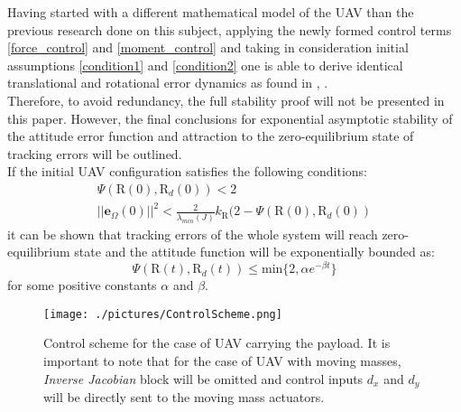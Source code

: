 Having started with a different mathematical model of the UAV than the previous research done on this subject, applying the newly formed control terms \ref{force_control} and \ref{moment_control} and taking in consideration initial assumptions \ref{condition1} and \ref{condition2} one is able to derive identical translational and rotational error dynamics as found in \cite{LeeClanak1}, \cite{LeeClanak4}. \\
Therefore, to avoid redundancy, the full stability proof will not be presented in this paper. However, the final conclusions for exponential asymptotic stability of the attitude error function and attraction to the zero-equilibrium state of tracking errors will be outlined. \\

If the initial UAV configuration satisfies the following conditions:
\begin{gather}
	\Psi (\text{R}(0), \text{R}_d(0)) < 2 \\
	||\textbf{e}_\Omega(0)||^2 < \frac{2}{\lambda_{min}(J)}k_\text{R}(2 - \Psi(\text{R}(0), \text{R}_d(0))
\end{gather}
it can be shown that tracking errors of the whole system will reach zero-equilibrium state and the attitude function will be exponentially bounded as:
\begin{equation}
	\Psi(\text{R}(t), \text{R}_d(t)) \leq \text{min}\{2, \alpha e^{-\beta t} \}
\end{equation}
for some positive constants $\alpha$ and $\beta$.

\begin{figure}
	\centering
	\texttt{[image: ./pictures/ControlScheme.png]}	
	\label{fig:control_scheme}
	\caption{Control scheme for the case of UAV carrying the payload. It is important to note that for the case of UAV with moving masses, \textit{Inverse Jacobian} block will be omitted and control inputs $d_x$ and $d_y$ will be directly sent to the moving mass actuators.}
\end{figure}